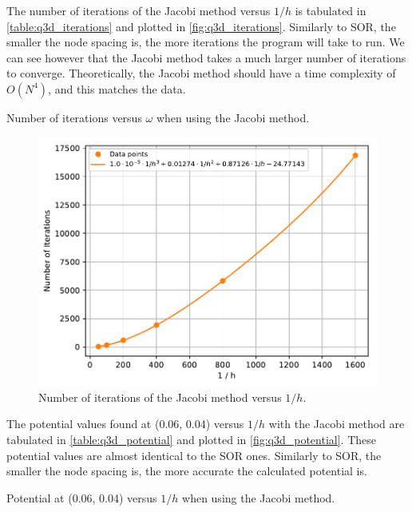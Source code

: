 \documentclass[a4paper,titlepage]{article}
\begin{document}
	The number of iterations of the Jacobi method versus $1/h$ is tabulated in \autoref{table:q3d_iterations} and plotted in \autoref{fig:q3d_iterations}. Similarly to SOR, the smaller the node spacing is, the more iterations the program will take to run. We can see however that the Jacobi method takes a much larger number of iterations to converge. Theoretically, the Jacobi method should have a time complexity of $O(N^4)$, and this matches the data.
	
	\begin{table}[!htb]
		\centering
		\caption{Number of iterations versus $\omega$ when using the Jacobi method.}
		\label{table:q3d_iterations}
	\end{table}

	\begin{figure}[!htb]
		\centering
		\includegraphics[width=\columnwidth]{plots/q3d_iterations.pdf}
		\caption
		{Number of iterations of the Jacobi method versus $1/h$.}
		\label{fig:q3d_iterations}
	\end{figure}

	The potential values found at (0.06, 0.04) versus $1/h$ with the Jacobi method are tabulated in \autoref{table:q3d_potential} and plotted in \autoref{fig:q3d_potential}. These potential values are almost identical to the SOR ones. Similarly to SOR, the smaller the node spacing is, the more accurate the calculated potential is.

	\begin{table}[!htb]
		\centering
		\caption{Potential at (0.06, 0.04) versus $1/h$ when using the Jacobi method.}
		\label{table:q3d_potential}
	\end{table}
\end{document}
